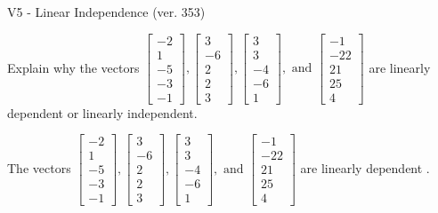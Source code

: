 \begin{exercise}
  \begin{exerciseTitle}V5 - Linear Independence (ver. 353)\end{exerciseTitle}
  \begin{exerciseStatement}
    Explain why the vectors \(\left[\begin{array}{r}
-2 \\
1 \\
-5 \\
-3 \\
-1
\end{array}\right] , \left[\begin{array}{r}
3 \\
-6 \\
2 \\
2 \\
3
\end{array}\right] , \left[\begin{array}{r}
3 \\
3 \\
-4 \\
-6 \\
1
\end{array}\right] , \text{ and } \left[\begin{array}{r}
-1 \\
-22 \\
21 \\
25 \\
4
\end{array}\right]\) are linearly dependent or linearly independent.	


  \end{exerciseStatement}
  \begin{exerciseAnswer}
   The vectors \(\left[\begin{array}{r}
-2 \\
1 \\
-5 \\
-3 \\
-1
\end{array}\right] , \left[\begin{array}{r}
3 \\
-6 \\
2 \\
2 \\
3
\end{array}\right] , \left[\begin{array}{r}
3 \\
3 \\
-4 \\
-6 \\
1
\end{array}\right] , \text{ and } \left[\begin{array}{r}
-1 \\
-22 \\
21 \\
25 \\
4
\end{array}\right]\) are 
  	 linearly dependent  .
  


  \end{exerciseAnswer}
\end{exercise}